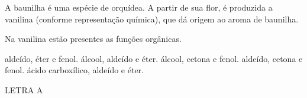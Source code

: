 \documentclass[9pt]{scrartcl}
\date{\today}
\title{}
\def\disciplina{Química}
\begin{document}
\twocolumn[

%
%




%

\smallbreak
\medbreak
\par\vspace{2ex}]%







\begin{exercise}[points=1.0]
A baunilha é uma espécie de orquídea. A partir de sua flor, é produzida a vanilina (conforme representação química), que dá origem ao aroma de baunilha.

\begin{center}
\end{center}


Na vanilina estão presentes as funções orgânicas.

\begin{choice}
\choice aldeído, éter e fenol.
\choice álcool, aldeído e éter.
\choice álcool, cetona e fenol.
\choice aldeído, cetona e fenol.
\choice ácido carboxílico, aldeído e éter.
\end{choice}
\end{exercise}
\begin{solution}
LETRA A
\end{solution}
\end{document}
